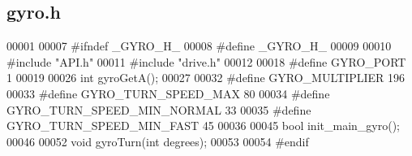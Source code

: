 \subsection{gyro.\+h}
\label{gyro_8h_source}

\begin{DoxyCode}
00001 
00007 \textcolor{preprocessor}{#ifndef \_GYRO\_H\_}
00008 \textcolor{preprocessor}{#define \_GYRO\_H\_}
00009 
00010 \textcolor{preprocessor}{#include "API.h"}
00011 \textcolor{preprocessor}{#include "drive.h"}
00012 
00018 \textcolor{preprocessor}{#define GYRO\_PORT 1}
00019 
00026 \textcolor{keywordtype}{int} gyroGetA();
00027 
00032 \textcolor{preprocessor}{#define GYRO\_MULTIPLIER 196}
00033 \textcolor{preprocessor}{#define GYRO\_TURN\_SPEED\_MAX 80}
00034 \textcolor{preprocessor}{#define GYRO\_TURN\_SPEED\_MIN\_NORMAL 33}
00035 \textcolor{preprocessor}{#define GYRO\_TURN\_SPEED\_MIN\_FAST 45}
00036 
00045 \textcolor{keywordtype}{bool} init_main_gyro();
00046 
00052 \textcolor{keywordtype}{void} gyroTurn(\textcolor{keywordtype}{int} degrees);
00053 
00054 \textcolor{preprocessor}{#endif}
\end{DoxyCode}
